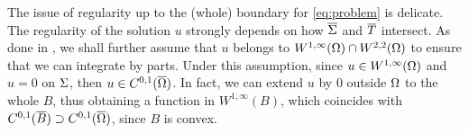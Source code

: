 \documentclass[a4paper,10pt]{amsart}
\numberwithin{equation}{section}
\begin{document}

The issue of regularity up to the (whole) boundary for \eqref{eq:problem} is delicate. The regularity of the solution $u$ strongly depends on how $\overline{\Sigma}$ and $\overline{T}$ intersect. 
As done in \cite{GX}, we shall further assume that $u$ belongs to $W^{1,\infty}(\Omega) \cap W^{2,2} (\Omega)$ to ensure that we can integrate by parts.
Under this assumption, since $u \in W^{1,\infty} (\Omega)$ and $u=0$ on $\Sigma$, then $u \in C^{0,1} (\overline{\Omega})$. In fact, we can extend $u$ by $0$ outside $\Omega$ to the whole $B$,
thus obtaining a function in $W^{1, \infty} (B)$, which coincides with $C^{0,1} (\overline{B})\supset C^{0,1} (\overline{\Omega})$, since $B$ is convex.



%
%
%
\end{document}
